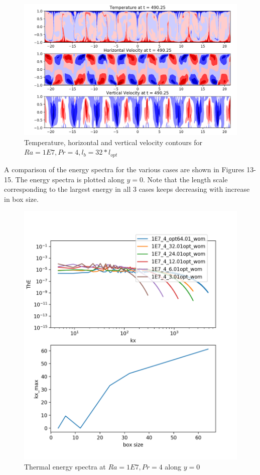 \documentclass[12pt]{article}
\begin{document}
   \begin{figure}[!htb]
   	\includegraphics[width=\linewidth]{contours_1E7_4_32.png}
   	\caption{Temperature, horizontal and vertical velocity contours for $Ra = 1E7, Pr =4, l_b = 32* l_{opt} $ }
   	\label{fig:fig12}
   \end{figure}

A comparison of the energy spectra for the various cases are shown in Figures 13-15. The energy spectra is plotted along $y = 0$. Note that the length scale corresponding to the largest energy in all 3 cases keeps decreasing with increase in box size.

  \begin{figure}[!htb]
  	\includegraphics[width=\linewidth]{ThE_1E7_4.png}
  	\caption{ Thermal energy spectra at $Ra = 1E7, Pr =4$ along $y = 0$}
  	\label{fig:fig13}
  \end{figure}
\end{document}
